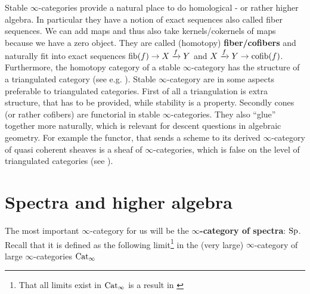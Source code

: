 \begin{itemize}
    Stable $\infty$-categories provide a natural place to do homological - or rather higher algebra. In particular they have a notion of exact sequences also called fiber sequences. We can add maps and thus also take kernels/cokernels of maps because we have a zero object. 
    They are called (homotopy) \textbf{fiber/cofibers} and naturally fit into exact sequences $\operatorname{fib}(f)\rightarrow X\xrightarrow{f} Y$ and $X\xrightarrow{f} Y\rightarrow \operatorname{cofib}(f)$. Furthermore, the homotopy category of a stable $\infty$-category has the structure of a triangulated category (see e.g. \cite[Theorem~1.1.2.14]{lurie2017higher}). Stable $\infty$-category are in some aspects preferable to triangulated categories.
    First of all a triangulation is extra structure, that has to be provided, while stability is a property. Secondly cones (or rather cofibers) are functorial in stable $\infty$-categories. 
    They also ``glue'' together more naturally, which is relevant for descent questions in algebraic geometry. For example the functor, that sends a scheme to its derived $\infty$-category of quasi coherent sheaves is a sheaf of $\infty$-categories, which is false on the level of triangulated categories (see \cite[Chapter~3]{GRastudyindag}).
    
\end{itemize}
\section{Spectra and higher algebra}\label{higheralg}
The most important $\infty$-category for us will be the\textbf{ $\infty$-category of spectra}: $\operatorname{Sp}$. Recall that it is defined as the following limit\footnote{That all limits exist in $\operatorname{Cat}_\infty$ is a result in \cite[Section~3.3.3]{HigherToposTheory}} in the (very large) $\infty$-category of large $\infty$-categories $\operatorname{Cat}_\infty$

